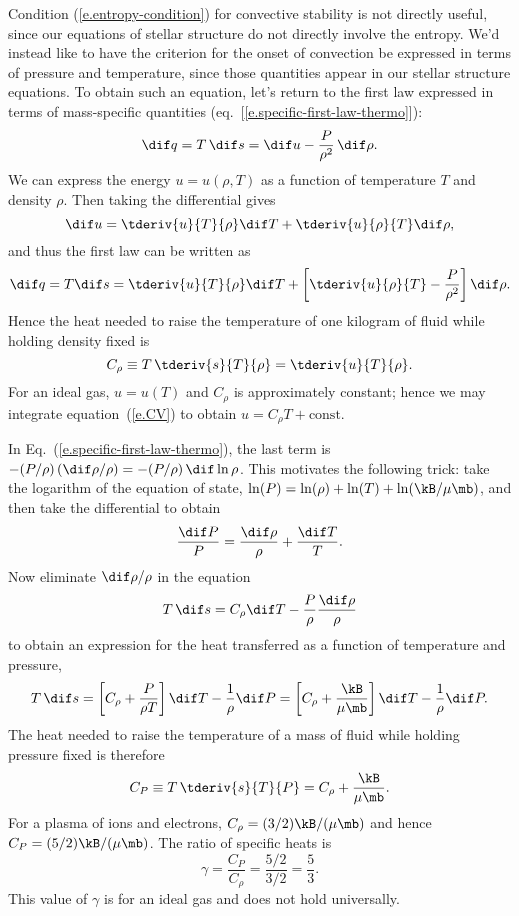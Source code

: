 Condition (\ref{e.entropy-condition}) for convective stability is not directly useful, since our equations of stellar structure do not directly involve the entropy. We'd instead like to have the criterion for the onset of convection be expressed in terms of pressure and temperature, since those quantities appear in our stellar structure equations. To obtain such an equation, 
let's return to the first law expressed in terms of mass-specific quantities (eq.~[\ref{e.specific-first-law-thermo}]):
\[
	\dif q = T\,\dif s = \dif u -\frac{P}{\rho^{2}}\,\dif \rho.
\]
We can express the energy $u = u(\rho,T)$ as a function of temperature $T$ and density $\rho$. Then taking the differential gives
\[ \dif u = \tderiv{u}{T}{\rho}\dif T + \tderiv{u}{\rho}{T}\dif \rho, \]
and thus the first law can be written as
\[ \dif q = T\dif s = \tderiv{u}{T}{\rho}\dif T + \left[\tderiv{u}{\rho}{T} - \frac{P}{\rho^{2}}\right]\dif \rho. \]
Hence the heat needed to raise the temperature of one kilogram of fluid while holding density fixed is
\begin{equation}\label{e.CV}
C_{\rho} \equiv T\,\tderiv{s}{T}{\rho} = \tderiv{u}{T}{\rho}.
\end{equation}
For an ideal gas, $u = u(T)$ and $C_{\rho}$ is approximately constant; hence we may integrate equation~(\ref{e.CV}) to obtain $u = C_{\rho}T + \textrm{const}$.

In Eq.~(\ref{e.specific-first-law-thermo}), the last term is $-(P/\rho)\, (\dif\rho/\rho) = -(P/\rho)\,\dif\ln\rho$. This motivates the following trick: take the logarithm of the equation of state, $\ln (P) = \ln(\rho) + \ln (T) + \ln (\kB/\mu\mb)$, and then take the differential to obtain
\[ \frac{\dif P}{P} = \frac{\dif\rho}{\rho} + \frac{\dif T}{T}. \]
Now eliminate $\dif\rho/\rho$ in the equation
\[ T\,\dif s = C_{\rho}\dif T - \frac{P}{\rho}\frac{\dif\rho}{\rho} \]
to obtain an expression for the heat transferred as a function of temperature and pressure,
\begin{equation}\label{e.first-law-pressure-temperature}
T\,\dif s = \left[C_{\rho} + \frac{P}{\rho T}\right]\dif T - \frac{1}{\rho}\dif P
	 = \left[C_{\rho} + \frac{\kB}{\mu\mb}\right]\dif T - \frac{1}{\rho}\dif P.
\end{equation}
The heat needed to raise the temperature of a mass of fluid while holding pressure fixed is therefore
\begin{equation}\label{e.CP}
C_{P}\equiv T\,\tderiv{s}{T}{P} = C_{\rho} + \frac{\kB}{\mu\mb}.
\end{equation}
For a plasma of ions and electrons, $C_\rho = (3/2)\kB/(\mu\mb)$ and hence $C_P = (5/2)\kB/(\mu\mb)$.  The ratio of specific heats is
\begin{equation}\label{e.gamma}
    \gamma = \frac{C_P}{C_\rho} = \frac{5/2}{3/2} = \frac{5}{3}.
\end{equation}
This value of $\gamma$ is for an ideal gas and does not hold universally.

